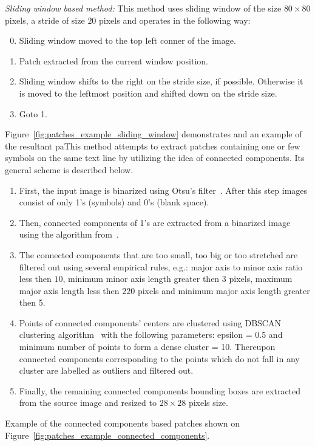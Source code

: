 \documentclass[conference,a4paper]{ieeetran}
\begin{document}
\textit{Sliding window based method:}
This method uses sliding window of the size $80\times 80$ pixels, a stride of size $20$ pixels and operates in the following way:
\begin{enumerate}
  \setcounter{enumi}{-1}
	\item Sliding window moved to the top left conner of the image.
	\item Patch extracted from the current window position.
	\item Sliding window shifts to the right on the stride size, if possible. Otherwise it is moved to the leftmost position and shifted down on the stride size.
	\item Goto 1.
\end{enumerate} 
Figure~\ref{fig:patches_example_sliding_window} demonstrates and an example of the resultant paThis method attempts to extract patches containing one or few symbols on the same text line by utilizing the idea of connected components. Its general scheme is described below.
\begin{enumerate}
	\item First, the input image is binarized using Otsu's filter~\cite{otsu1975threshold}. After this step images consist of only 1's (symbols) and 0's (blank space).
	\item Then, connected components of 1's are extracted from a binarized image using the algorithm from~\cite{fiorio1996connected_components}. 
	\item The connected components that are too small, too big or too stretched are filtered out using several empirical rules, e.g.: major axis to minor axis ratio less then $10$, minimum minor axis length greater then $3$ pixels, maximum major axis length less then $220$ pixels and  minimum major axis length greater then 5.
	\item Points of connected components' centers are clustered using DBSCAN clustering algorithm~\cite{ester1996dbscan,GranVolk} with the following parameters: epsilon = 0.5 and minimum number of points to form a dense cluster = 10. Thereupon connected components corresponding to the points which do not fall in any cluster are labelled as outliers and filtered out.
	\item Finally, the remaining connected components bounding boxes are extracted from the source image and resized to $28\times 28$ pixels size.
\end{enumerate}

Example of the connected components based patches shown on Figure~\ref{fig:patches_example_connected_components}. 
\end{document}
